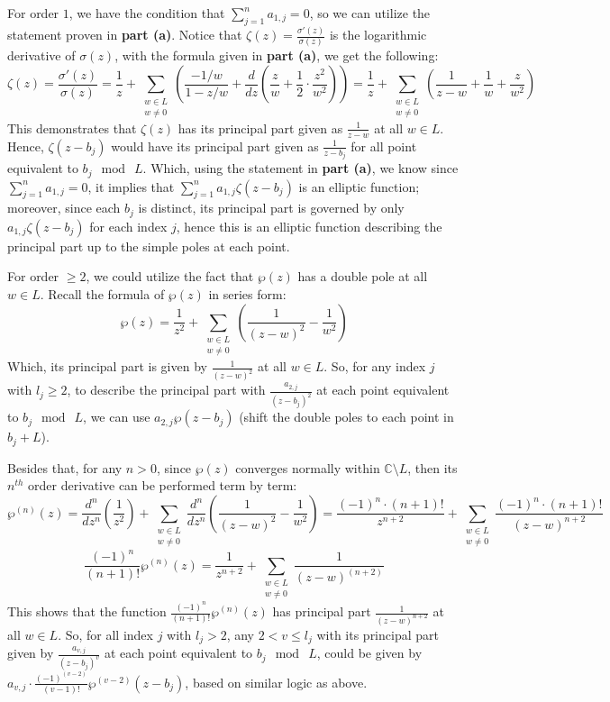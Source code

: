 \documentclass{article}
\begin{document}
\begin{itemize}
    For order $1$, we have the condition that $\sum_{j=1}^{n}a_{1,j}=0$, so we can utilize the statement proven in \textbf{part (a)}. Notice that $\zeta(z)=\frac{\sigma'(z)}{\sigma(z)}$ is the logarithmic derivative of $\sigma(z)$, with the formula given in \textbf{part (a)}, we get the following:
    $$\zeta(z)=\frac{\sigma'(z)}{\sigma(z)}=\frac{1}{z}+\sum_{\substack{w\in L\\w\neq 0}}\left(\frac{-1/w}{1-z/w}+\frac{d}{dz}\left(\frac{z}{w}+\frac{1}{2}\cdot\frac{z^2}{w^2}\right)\right) = \frac{1}{z}+\sum_{\substack{w\in L\\w\neq 0}}\left(\frac{1}{z-w}+\frac{1}{w}+\frac{z}{w^2}\right)$$
    This demonstrates that $\zeta(z)$ has its principal part given as $\frac{1}{z-w}$ at all $w\in L$. Hence, $\zeta(z-b_j)$ would have its principal part given as $\frac{1}{z-b_j}$ for all point equivalent to $b_j\mod\ L$. 
    Which, using the statement in \textbf{part (a)}, we know since $\sum_{j=1}^{n}a_{1,j}=0$, it implies that $\sum_{j=1}^{n}a_{1,j}\zeta(z-b_j)$ is an elliptic function; moreover, since each $b_j$ is distinct, its principal part is governed by only $a_{1,j}\zeta(z-b_j)$ for each index $j$, hence this is an elliptic function describing the principal part up to the simple poles at each point.

    \hfil

    For order $\geq 2$, we could utilize the fact that $\wp(z)$ has a double pole at all $w\in L$. Recall the formula of $\wp(z)$ in series form:
    $$\wp(z) = \frac{1}{z^2}+\sum_{\substack{w\in L\\w\neq 0}}\left(\frac{1}{(z-w)^2}-\frac{1}{w^2}\right)$$
    Which, its principal part is given by $\frac{1}{(z-w)^2}$ at all $w\in L$. So, for any index $j$ with $l_j\geq 2$, to describe the principal part with $\frac{a_{2,j}}{(z-b_j)^2}$ at each point equivalent to $b_j\mod\ L$, we can use $a_{2,j}\wp(z-b_j)$ (shift the double poles to each point in $b_j+L$).
    
    Besides that, for any $n> 0$, since $\wp(z)$ converges normally within $\mathbb{C}\setminus L$, then its $n^{th}$ order derivative can be performed term by term:
    $$\wp^{(n)}(z)=\frac{d^n}{dz^n}\left(\frac{1}{z^2}\right)+\sum_{\substack{w\in L\\w\neq 0}}\frac{d^n}{dz^n}\left(\frac{1}{(z-w)^2}-\frac{1}{w^2}\right) = \frac{(-1)^n\cdot (n+1)!}{z^{n+2}}+\sum_{\substack{w\in L\\w\neq 0}}\frac{(-1)^n\cdot (n+1)!}{(z-w)^{n+2}}$$
    $$\frac{(-1)^n}{(n+1)!}\wp^{(n)}(z) = \frac{1}{z^{n+2}}+\sum_{\substack{w\in L\\w\neq 0}}\frac{1}{(z-w)^{(n+2)}}$$
    This shows that the function $\frac{(-1)^n}{(n+1)!}\wp^{(n)}(z)$ has principal part $\frac{1}{(z-w)^{n+2}}$ at all $w\in L$. So, for all index $j$ with $l_j >2$, any $2<v\leq l_j$ with its principal part given by $\frac{a_{v,j}}{(z-b_j)^{v}}$ at each point equivalent to $b_j\mod\ L$, could be given by $a_{v,j}\cdot\frac{(-1)^{(v-2)}}{(v-1)!}\wp^{(v-2)}(z-b_j)$, based on similar logic as above.


\end{itemize}
\end{document}

